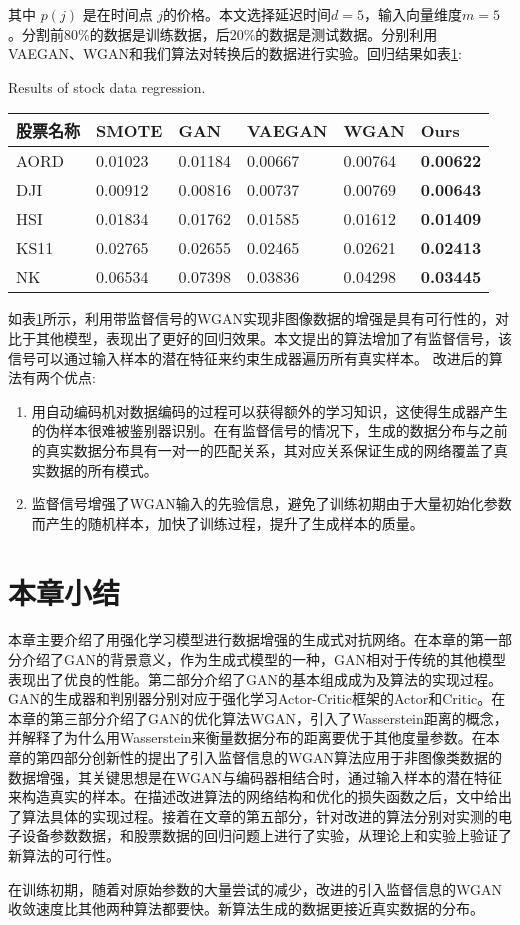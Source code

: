 其中 $p(j)$ 是在时间点 $j$的价格。本文选择延迟时间$d=5$，输入向量维度$m=5$。分割前$80\% $的数据是训练数据，后$20\% $的数据是测试数据。分别利用VAEGAN、WGAN和我们算法对转换后的数据进行实验。回归结果如表\ref{tab2}:

\begin{table}[htpb]
	\centering
	{Results of stock data regression.}
	\label{tab2}
	\begin{tabular}{llllll} \toprule
		股票名称 &SMOTE& GAN &  VAEGAN & WGAN &Ours  \\ 
		\midrule
		AORD& 0.01023&0.01184 & 0.00667 & 0.00764 &\textbf{0.00622}   \\
		DJI &0.00912&0.00816&0.00737&0.00769&\textbf{0.00643}  \\
		HSI&0.01834&0.01762&0.01585&0.01612&\textbf{0.01409}  \\
		KS11&0.02765&0.02655&0.02465&0.02621&\textbf{0.02413}\\
		NK &0.06534& 0.07398& 0.03836& 0.04298&\textbf{0.03445} \\
		\bottomrule
	\end{tabular}
\end{table}

如表\ref{tab2}所示，利用带监督信号的WGAN实现非图像数据的增强是具有可行性的，对比于其他模型，表现出了更好的回归效果。本文提出的算法增加了有监督信号，该信号可以通过输入样本的潜在特征来约束生成器遍历所有真实样本。
改进后的算法有两个优点:
\begin{enumerate}
	\item 用自动编码机对数据编码的过程可以获得额外的学习知识，这使得生成器产生的伪样本很难被鉴别器识别。在有监督信号的情况下，生成的数据分布与之前的真实数据分布具有一对一的匹配关系，其对应关系保证生成的网络覆盖了真实数据的所有模式。
	\item 监督信号增强了WGAN输入的先验信息，避免了训练初期由于大量初始化参数而产生的随机样本，加快了训练过程，提升了生成样本的质量。
\end{enumerate}

\section{本章小结}

本章主要介绍了用强化学习模型进行数据增强的生成式对抗网络。在本章的第一部分介绍了GAN的背景意义，作为生成式模型的一种，GAN相对于传统的其他模型表现出了优良的性能。第二部分介绍了GAN的基本组成成为及算法的实现过程。GAN的生成器和判别器分别对应于强化学习Actor-Critic框架的Actor和Critic。在本章的第三部分介绍了GAN的优化算法WGAN，引入了Wasserstein距离的概念，并解释了为什么用Wasserstein来衡量数据分布的距离要优于其他度量参数。在本章的第四部分创新性的提出了引入监督信息的WGAN算法应用于非图像类数据的数据增强，其关键思想是在WGAN与编码器相结合时，通过输入样本的潜在特征来构造真实的样本。在描述改进算法的网络结构和优化的损失函数之后，文中给出了算法具体的实现过程。接着在文章的第五部分，针对改进的算法分别对实测的电子设备参数数据，和股票数据的回归问题上进行了实验，从理论上和实验上验证了新算法的可行性。

在训练初期，随着对原始参数的大量尝试的减少，改进的引入监督信息的WGAN收敛速度比其他两种算法都要快。新算法生成的数据更接近真实数据的分布。